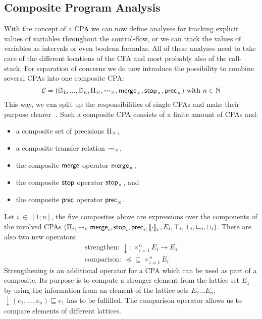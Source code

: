 \clearpage
\subsection{Composite Program Analysis}\label{title:compositeCPA}
With the concept of a \ac{CPA} we can now define analyses for tracking explicit values of variables throughout the control-flow, or we can track the values of variables as intervals or even boolean 
formulas. All of these analyses need to take care of the different locations of the \ac{CFA} and most probably also of the call-stack. For separation of concerns we do now introduce the possibility
to combine several \acp{CPA} into one composite \ac{CPA}:
\begin{displaymath}
  \mathcal{C} = (\DD_1, ..., \DD_n, \precision_\times, \transabs_\times, \mergeop_\times, \stopop_\times, \precop_\times) \text{ with } n \in \NN
\end{displaymath}
This way, we can split up the responsibilities of single \acp{CPA} and make their purpose clearer\,~\cite{Beyer:DynamicPrecisionAdjustment}. Such a composite \ac{CPA} consists of a finite amount of \acp{CPA} and: 
\begin{itemize}
 \item a composite set of precisions $\Pi_\times$,
 \item a composite transfer relation $\operatorname{\leadsto}_\times$,
 \item the composite $\operatorname{\mathsf{merge}}$ operator $\operatorname{\mathsf{merge}}_\times$,
 \item the composite $\operatorname{\mathsf{stop}}$ operator $\operatorname{\mathsf{stop}}_\times$, and
 \item the composite $\operatorname{\mathsf{prec}}$ operator $\operatorname{\mathsf{prec}}_\times$.
\end{itemize}
 Let $i~\in~[1;n]$, the five composites above are expressions over the components of the involved \acp{CPA} $(\Pi_i, \operatorname{\leadsto}_i, \operatorname{\mathsf{merge}}_i, \operatorname{\mathsf{stop}}_i, \operatorname{\mathsf{prec}}_i, \left\llbracket \cdot \right\rrbracket_i, E_i,\\ \top_i, \bot_i, \sqsubseteq_i, \sqcup_i)$. There are also two new operators:
 \begin{gather*}
  \text{strengthen: } \downarrow : \times^n_{i=1} E_i \rightarrow E_1\\
  \text{comparison: } \preceq \subseteq \times^n_{i=1} E_i
 \end{gather*}
 Strengthening is an additional operator for a \ac{CPA} which can be used as part of a composite. Its purpose is to compute a stronger element from the lattice set $E_1$ by using the information from an element of the lattice sets $E_2 ... E_n$; $\downarrow (e_1, ..., e_n) \sqsubseteq e_1$ has to be fulfilled. The comparison operator allows us to compare elements of different lattices.

